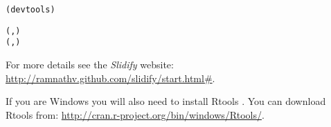 \begin{knitrout}
\color{fgcolor}\begin{kframe}
\begin{alltt}
(devtools)

(, )
(, )
\end{alltt}
\end{kframe}
\end{knitrout}


\noindent For more details see the \emph{Slidify} website: \url{http://ramnathv.github.com/slidify/start.html#}.

If you are Windows you will also need to install Rtools \cite[]{Rtools}. You can download Rtools from: \url{http://cran.r-project.org/bin/windows/Rtools/}.\label{RtoolsDownload}




